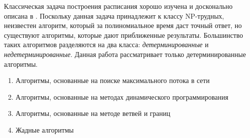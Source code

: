Классическая задача построения расписания хорошо изучена и досконально описана в \cite{Coffman}. Поскольку данная задача принадлежит к классу NP-трудных, неизвестен алгоритм, который за полиномиальное время даст точный ответ, но существуют алгоритмы, которые дают приближенные результаты. Большинство таких алгоритмов разделяются на два класса: \textit{детерминированные} и \textit{недетерминированные}. Данная работа рассматривает только детерминированные алгоритмы.
\begin{enumerate}
    \item Алгоритмы, основанные на поиске максимального потока в сети
    \item Алгоритмы, основанные на методах динамического программирования
    \item Алгоритмы, основанные на методе ветвей и границ
    \item Жадные алгоритмы
\end{enumerate}
